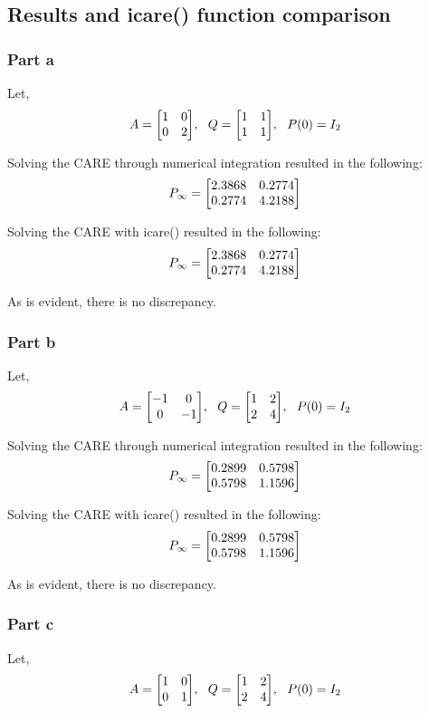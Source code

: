\documentclass[]{article}
\begin{document}
	\newpage
	\subsection{Results and icare() function comparison}
		\subsubsection{Part a}
			Let,
			\begin{equation}
				A = \mqty[\dmat[0]{1,2}], \ \ Q = \mqty[\xmat{1}{2}{2}], \ \ P(0) = I_2
			\end{equation}
			
			Solving the CARE through numerical integration resulted in the following:
			\begin{equation}
				P_\infty = \mqty[2.3868 & 0.2774\\ 0.2774 & 4.2188]
			\end{equation}
			
			Solving the CARE with icare() resulted in the following:
			\begin{equation}
				P_\infty = \mqty[2.3868 & 0.2774\\ 0.2774 & 4.2188]
			\end{equation}
			
			As is evident, there is no discrepancy.
			
		\subsubsection{Part b}
			Let,
			\begin{equation}
				A = \mqty[\dmat[0]{-1,-1}], \ \ Q = \mqty[\dmat[2]{1,4}], \ \ P(0) = I_2
			\end{equation}
			
			Solving the CARE through numerical integration resulted in the following:
			\begin{equation}
				P_\infty = \mqty[0.2899 &0.5798\\ 0.5798 &1.1596]
			\end{equation}
			
			Solving the CARE with icare() resulted in the following:
			\begin{equation}
				P_\infty = \mqty[0.2899 &0.5798\\ 0.5798 &1.1596]
			\end{equation}
			
			As is evident, there is no discrepancy.
			
		\subsubsection{Part c}
			Let,
			\begin{equation}
				A = \mqty[\dmat[0]{1,1}], \ \ Q = \mqty[\dmat[2]{1,4}], \ \ P(0) = I_2
			\end{equation}
			
\end{document}
